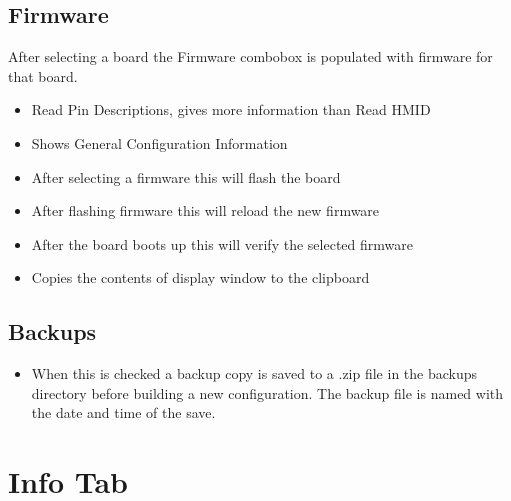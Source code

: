\documentclass[letterpaper,10pt,english,openany,oneside]{sphinxmanual}
\begin{document}
\section{Firmware}
\label{\detokenize{machine:firmware}}
After selecting a board the Firmware combobox is populated with firmware
for that board.
\begin{itemize}
\item {} 
 \sphinxhyphen{} Read Pin Descriptions, gives more information than Read HMID

\item {} 
 \sphinxhyphen{} Shows General Configuration Information

\item {} 
 \sphinxhyphen{} After selecting a firmware this will flash the board

\item {} 
 \sphinxhyphen{} After flashing firmware this will reload the new firmware

\item {} 
 \sphinxhyphen{} After the board boots up this will verify the selected firmware

\item {} 
 \sphinxhyphen{} Copies the contents of display window to the clipboard

\end{itemize}


\section{Backups}
\label{\detokenize{machine:backups}}\begin{itemize}
\item {} 
 \sphinxhyphen{} When this is checked a backup copy is saved to a
.zip file in the backups directory before building a new configuration.
The backup file is named with the date and time of the save.

\end{itemize}


\chapter{Info Tab}
\label{\detokenize{info:info-tab}}\label{\detokenize{info::doc}}
\end{document}
